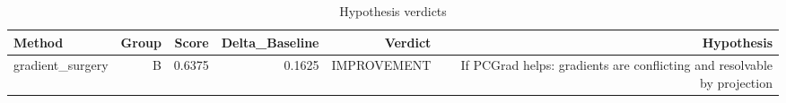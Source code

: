 \begin{table}[htbp]
\centering
\caption{Hypothesis verdicts}
\label{tab:hyp-verdicts}
\begin{tabular}{lrrrrr}
\toprule
\textbf{Method} & \textbf{Group} & \textbf{Score} & \textbf{Delta\_Baseline} & \textbf{Verdict} & \textbf{Hypothesis} \\
\midrule
gradient\_surgery & B & 0.6375 & 0.1625 & IMPROVEMENT & If PCGrad helps: gradients are conflicting and resolvable by projection \\
\bottomrule
\end{tabular}
\end{table}